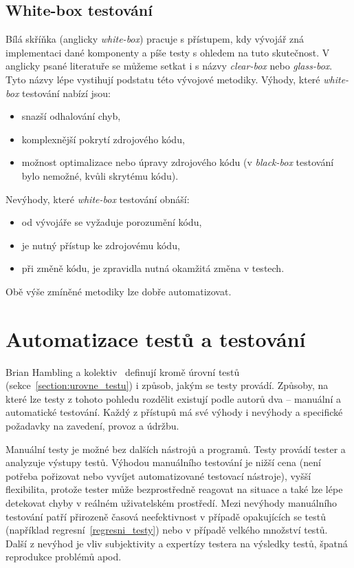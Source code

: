 \subsection{White-box testování}
Bílá skříňka (anglicky \textit{white-box}) pracuje s přístupem, kdy vývojář zná implementaci dané komponenty a píše testy s ohledem na tuto skutečnost.
V anglicky psané literatuře se můžeme setkat i s názvy \textit{clear-box} nebo \textit{glass-box}. Tyto názvy lépe vystihují podstatu této vývojové metodiky.
Výhody, které \textit{white-box} testování nabízí jsou:
\begin{itemize}
    \item snazší odhalování chyb,
    \item komplexnější pokrytí zdrojového kódu,
    \item možnost optimalizace nebo úpravy zdrojového kódu (v \textit{black-box} testování bylo nemožné, kvůli skrytému kódu).
\end{itemize}
Nevýhody, které \textit{white-box} testování obnáší:
\begin{itemize}
    \item od vývojáře se vyžaduje porozumění kódu,
    \item je nutný přístup ke zdrojovému kódu,
    \item při změně kódu, je zpravidla nutná okamžitá změna v testech.
\end{itemize}
Obě výše zmíněné metodiky lze dobře automatizovat.

\section{Automatizace testů a testování}
\label{section:automatizace_testu_a_testovani}
Brian Hambling a kolektiv~\cite{SoftwareTesting} definují kromě úrovní testů (sekce~\ref{section:urovne_testu}) i způsob, jakým se testy provádí. Způsoby, na které lze testy z tohoto pohledu rozdělit existují podle autorů dva -- manuální a automatické testování. Každý z přístupů má své výhody i nevýhody a specifické požadavky na zavedení, provoz a údržbu.

Manuální testy je možné bez dalších nástrojů a programů. Testy provádí tester a analyzuje výstupy testů. Výhodou manuálního testování je nižší cena (není potřeba pořizovat nebo vyvíjet automatizované testovací nástroje), vyšší flexibilita, protože tester může bezprostředně reagovat na situace a také lze lépe detekovat chyby v reálném uživatelském prostředí. Mezi nevýhody manuálního testování patří přirozeně časová neefektivnost v případě opakujících se testů (například regresní~\ref{regresni_testy}) nebo v případě velkého množství testů. Další z nevýhod je vliv subjektivity a expertízy testera na výsledky testů, špatná reprodukce problémů apod.

